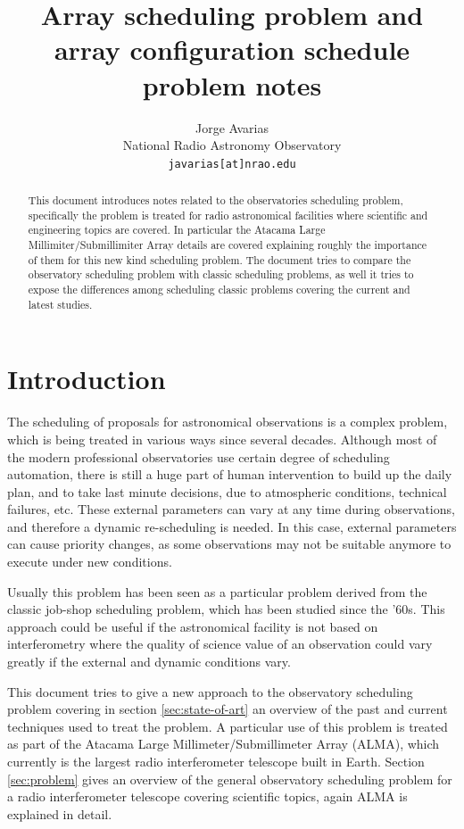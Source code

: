 \documentclass[11pt]{article}
\begin{document}
\title{Array scheduling problem and array configuration schedule problem notes}
\author{Jorge Avarias \\
National Radio Astronomy Observatory\\
\texttt{javarias[at]nrao.edu}}
\maketitle

\begin{abstract}
This document introduces notes related to the observatories scheduling problem, specifically the problem is treated for radio astronomical facilities where scientific and engineering topics are covered. In particular the Atacama Large Millimiter/Submillimiter Array details are covered explaining roughly the importance of them for this new kind scheduling problem. The document tries to compare the observatory scheduling problem with classic scheduling problems, as well it tries to expose the differences among scheduling classic problems covering the current and latest studies. 
\end{abstract}

\section{Introduction}
The scheduling of proposals for astronomical observations is a complex problem, which is being treated in various ways since several decades. Although most of the modern professional observatories use certain degree of scheduling automation, there is still a huge part of human intervention to build up the daily plan, and to take last minute decisions, due to atmospheric conditions, technical failures, etc. These external parameters can vary at any time during observations, and therefore a dynamic re-scheduling is needed. In this case, external parameters can cause priority changes, as some observations may not be suitable anymore to execute under new conditions.

Usually this problem has been seen as a particular problem derived from the classic job-shop scheduling problem, which has been studied since the '60s. This approach could be useful if the astronomical facility is not based on interferometry where the quality of science value of an observation could vary greatly if the external and dynamic conditions vary. 

This document tries to give a new approach to the observatory scheduling problem covering in section \ref{sec:state-of-art} an overview of the past and current techniques used to treat the problem. A particular use of this problem is treated as part of the Atacama Large Millimeter/Submillimeter Array (ALMA), which currently is the largest radio interferometer telescope built in Earth. Section \ref{sec:problem} gives an overview of the general observatory scheduling problem for a radio interferometer telescope covering scientific topics, again ALMA is explained in detail.
\end{document}
